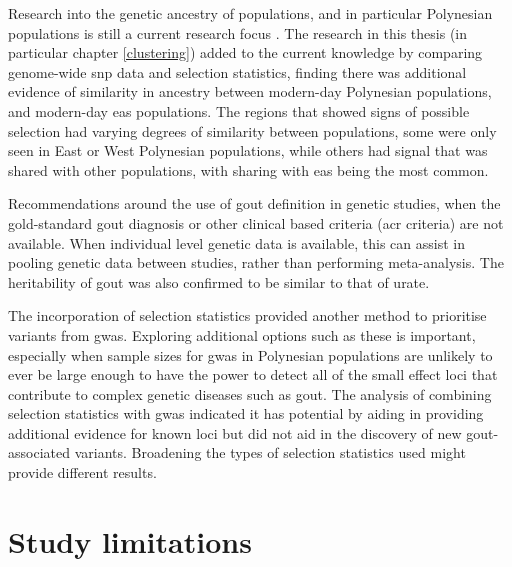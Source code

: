 \documentclass[]{report}
\begin{document}
Research into the genetic ancestry of populations, and in particular
Polynesian populations is still a current research focus
\citep{Hudjashov2018, Matisoo-Smith2018}. The research in this thesis
(in particular chapter \ref{clustering}) added to the current knowledge
by comparing genome-wide \gls{snp} data and selection statistics,
finding there was additional evidence of similarity in ancestry between
modern-day Polynesian populations, and modern-day \gls{eas} populations.
The regions that showed signs of possible selection had varying degrees
of similarity between populations, some were only seen in East or West
Polynesian populations, while others had signal that was shared with
other populations, with sharing with \gls{eas} being the most common.

Recommendations around the use of gout definition in genetic studies,
when the gold-standard gout diagnosis or other clinical based criteria
(\gls{acr} criteria) are not available. When individual level genetic
data is available, this can assist in pooling genetic data between
studies, rather than performing meta-analysis. The heritability of gout
was also confirmed to be similar to that of urate.

The incorporation of selection statistics provided another method to
prioritise variants from \gls{gwas}. Exploring additional options such
as these is important, especially when sample sizes for \gls{gwas} in
Polynesian populations are unlikely to ever be large enough to have the
power to detect all of the small effect loci that contribute to complex
genetic diseases such as gout. The analysis of combining selection
statistics with \gls{gwas} indicated it has potential by aiding in
providing additional evidence for known loci but did not aid in the
discovery of new gout-associated variants. Broadening the types of
selection statistics used might provide different results.

\section{Study limitations}\label{study-limitations}
\end{document}
